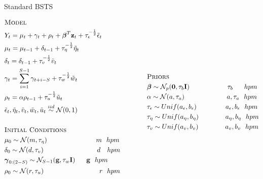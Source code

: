 \documentclass{beamer}
\begin{document}
\begin{frame}{Standard BSTS}
\tiny

\begin{equation*}
	\begin{aligned}
&\textsc{Model}\\
&Y_t = \mu_t + \gamma_t + \rho_t + \boldsymbol{\beta}^T\mathbf{z}_t + \tau_\epsilon^{-\frac{1}{2}}\tilde{\epsilon}_t\\
&\mu_t = \mu_{t-1} + \delta_{t-1} +\tau_\eta^{-\frac{1}{2}}\tilde{\eta}_t\\
&\delta_t = \delta_{t-1} + \tau_v^{-\frac{1}{2}}\tilde{v}_t\\
&\gamma_t = \sum_{i=1}^{S-1}\gamma_{t+i-S} + \tau_w^{-\frac{1}{2}}\tilde{w}_t\\
&\rho_t = \alpha\rho_{t-1} + \tau_u^{-\frac{1}{2}}\tilde{u}_t\\
&\tilde{\epsilon}_t, \tilde{\eta}_t, \tilde{v}_t, \tilde{w}_t, \tilde{u}_t \overset{iid}{\sim} \mathcal{N}(0,1)\\
\\
&\textsc{Initial Conditions}\\
&\mu_0 \sim \mathcal{N}(m, \tau_\eta)\quad \quad\quad\quad \quad \quad \quad\  m\ \ hpm\\
&\delta_0 \sim \mathcal{N}(d, \tau_v)\quad\quad\quad\quad \quad \quad \quad \quad d\ \ \ hpm\\
&\boldsymbol{\gamma}_{0:(2-S)} \sim \mathcal{N}_{S-1}(\mathbf{g}, \tau_w\mathbf{I})\quad\ \ \mathbf{g}\ \ hpm\\
&\rho_0 \sim \mathcal{N}(r, \tau_u)\quad \quad\quad\quad \quad \quad \quad \quad \ r\ \ hpm\\
\\
\end{aligned}
\qquad \qquad
\begin{aligned}[c]
&\textsc{Priors}\\
&\boldsymbol{\beta} \sim \mathcal{N}_p(\mathbf{0}, \tau_b \mathbf{I})\ \ \quad \quad \quad \quad \quad \tau_b\ \quad \ hpm\\
&\alpha \sim \mathcal{N}(a, \tau_a) \ \quad \quad \quad \quad \quad \quad a, \tau_a\ \ hpm\\
&\tau_\epsilon \sim Unif(a_\epsilon, b_\epsilon)\quad\quad\ \quad \quad a_\epsilon, b_\epsilon\ \ hpm\\
&\tau_\eta \sim Unif(a_\eta, b_\eta)\quad\quad\quad \quad a_\eta, b_\eta\ \ hpm\\
&\tau_v \sim Unif(a_v, b_v)\quad\quad\quad \quad a_v, b_v\ \ hpm\\

\end{aligned}
\end{equation*}
\end{frame}
\end{document}
